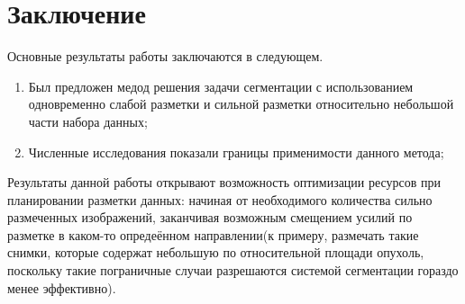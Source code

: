 \chapter*{Заключение}						%


Основные результаты работы заключаются в следующем.
%

\begin{enumerate}
    \item Был предложен медод решения задачи сегментации с использованием одновременно слабой разметки и сильной разметки относительно небольшой части набора данных;
    \item Численные исследования показали границы применимости данного метода;
\end{enumerate}

Результаты данной работы открывают возможность оптимизации ресурсов при планировании разметки данных: начиная от необходимого количества сильно размеченных изображений, заканчивая возможным смещением усилий по разметке в каком-то опредеённом направлении(к примеру, размечать такие снимки, которые содержат небольшую по относительной площади опухоль, поскольку такие пограничные случаи разрешаются системой сегментации гораздо менее эффективно). 
